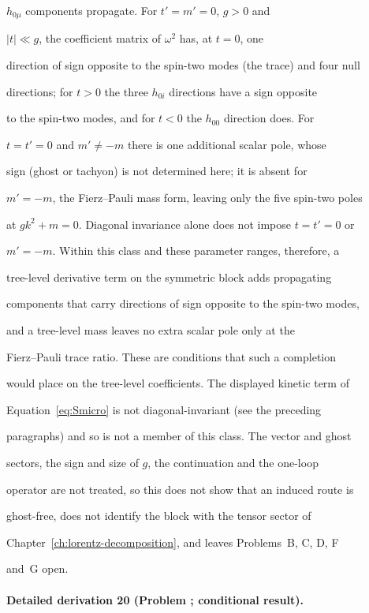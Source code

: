 \(h_{0\mu}\) components propagate.  For \(t'=m'=0\), \(g>0\) and

\(|t|\ll g\), the coefficient matrix of \(\omega^2\) has, at \(t=0\), one

direction of sign opposite to the spin-two modes (the trace) and four null

directions; for \(t>0\) the three \(h_{0i}\) directions have a sign opposite

to the spin-two modes, and for \(t<0\) the \(h_{00}\) direction does.  For

\(t=t'=0\) and \(m'\neq-m\) there is one additional scalar pole, whose

sign (ghost or tachyon) is not determined here; it is absent for

\(m'=-m\), the Fierz--Pauli mass form, leaving only the five spin-two poles

at \(gk^2+m=0\).  Diagonal invariance alone does not impose \(t=t'=0\) or

\(m'=-m\).  Within this class and these parameter ranges, therefore, a

tree-level derivative term on the symmetric block adds propagating

components that carry directions of sign opposite to the spin-two modes,

and a tree-level mass leaves no extra scalar pole only at the

Fierz--Pauli trace ratio.  These are conditions that such a completion

would place on the tree-level coefficients.  The displayed kinetic term of

Equation~\eqref{eq:Smicro} is not diagonal-invariant (see the preceding

paragraphs) and so is not a member of this class.  The vector and ghost

sectors, the sign and size of \(g\), the continuation and the one-loop

operator are not treated, so this does not show that an induced route is

ghost-free, does not identify the block with the tensor sector of

Chapter~\ref{ch:lorentz-decomposition}, and leaves Problems~B, C, D, F

and~G open.



\paragraph{Detailed derivation 20 (Problem ; conditional result).} \label{ref:detail-19} %




